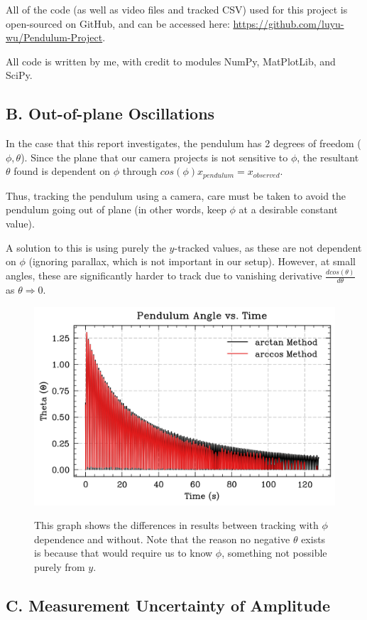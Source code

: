 \documentclass[prl,twocolumn,amsmath,amssymb,superscriptaddress]{revtex4-2}
\begin{document}
All of the code (as well as video files and tracked CSV) used for this project is open-sourced on GitHub, and can be accessed here: \href{https://github.com/luyu-wu/Pendulum-Project}{https://github.com/luyu-wu/Pendulum-Project}.

All code is written by me, with credit to modules NumPy, MatPlotLib, and SciPy.

\subsection{B. Out-of-plane Oscillations}

In the case that this report investigates, the pendulum has 2 degrees of freedom ($\phi, \theta$). Since the plane that our camera projects is not sensitive to $\phi$, the resultant $\theta$ found is dependent on $\phi$ through $cos(\phi)x_{pendulum} = x_{observed}$.

Thus, tracking the pendulum using a camera, care must be taken to avoid the pendulum going out of plane (in other words, keep $\phi$ at a desirable constant value).

A solution to this is using purely the $y$-tracked values, as these are not dependent on $\phi$ (ignoring parallax, which is not important in our setup).
However, at small angles, these are significantly harder to track due to vanishing derivative $\frac{dcos(\theta)}{d\theta}$ as $\theta \Rightarrow 0$.


\begin{figure}[htb]
    \includegraphics[width=0.4\linewidth]{out-of-plane.png}
    \label{fig:out-of-plane}
    \caption{This graph shows the differences in results between tracking with $\phi$ dependence and without. Note that the reason no negative $\theta$ exists is because that would require us to know $\phi$, something not possible purely from $y$.}
\end{figure}

\subsection{C. Measurement Uncertainty of Amplitude}
\end{document}
